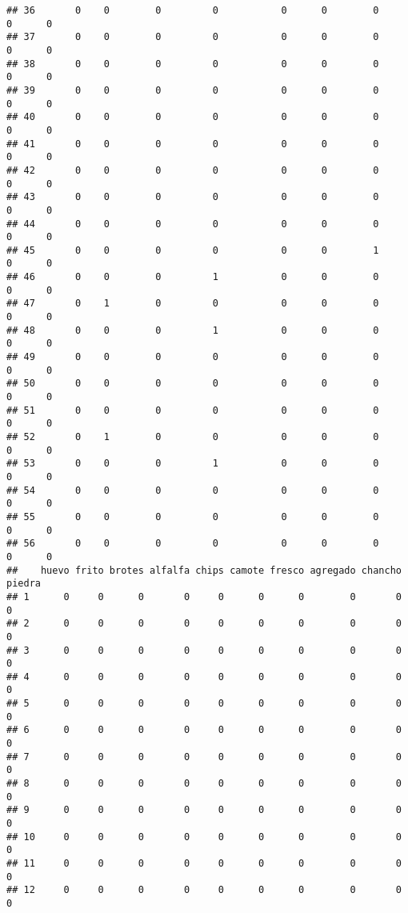 \documentclass[
]{article}
\begin{document}
\begin{verbatim}
## 36       0    0        0         0           0      0        0     0      0
## 37       0    0        0         0           0      0        0     0      0
## 38       0    0        0         0           0      0        0     0      0
## 39       0    0        0         0           0      0        0     0      0
## 40       0    0        0         0           0      0        0     0      0
## 41       0    0        0         0           0      0        0     0      0
## 42       0    0        0         0           0      0        0     0      0
## 43       0    0        0         0           0      0        0     0      0
## 44       0    0        0         0           0      0        0     0      0
## 45       0    0        0         0           0      0        1     0      0
## 46       0    0        0         1           0      0        0     0      0
## 47       0    1        0         0           0      0        0     0      0
## 48       0    0        0         1           0      0        0     0      0
## 49       0    0        0         0           0      0        0     0      0
## 50       0    0        0         0           0      0        0     0      0
## 51       0    0        0         0           0      0        0     0      0
## 52       0    1        0         0           0      0        0     0      0
## 53       0    0        0         1           0      0        0     0      0
## 54       0    0        0         0           0      0        0     0      0
## 55       0    0        0         0           0      0        0     0      0
## 56       0    0        0         0           0      0        0     0      0
##    huevo frito brotes alfalfa chips camote fresco agregado chancho piedra
## 1      0     0      0       0     0      0      0        0       0      0
## 2      0     0      0       0     0      0      0        0       0      0
## 3      0     0      0       0     0      0      0        0       0      0
## 4      0     0      0       0     0      0      0        0       0      0
## 5      0     0      0       0     0      0      0        0       0      0
## 6      0     0      0       0     0      0      0        0       0      0
## 7      0     0      0       0     0      0      0        0       0      0
## 8      0     0      0       0     0      0      0        0       0      0
## 9      0     0      0       0     0      0      0        0       0      0
## 10     0     0      0       0     0      0      0        0       0      0
## 11     0     0      0       0     0      0      0        0       0      0
## 12     0     0      0       0     0      0      0        0       0      0

\end{verbatim}
\end{document}
